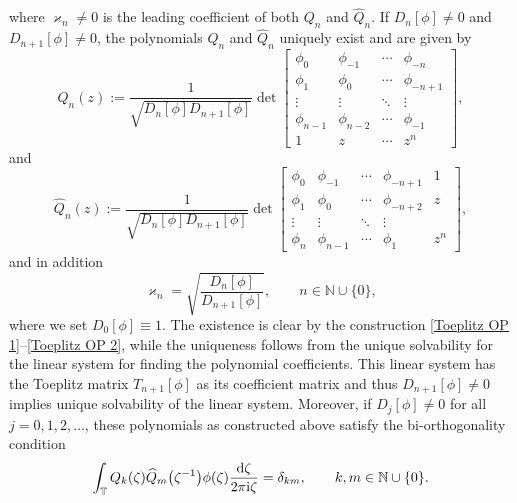 \documentclass[10pt,a4paper]{amsart}
\numberwithin{equation}{section}
\newcommand{\N}{{\mathbb N}}
\newcommand{\T}{{\mathbb T}}
\newcommand{\de}{\delta}
\newcommand{\ze}{\zeta}
\newcommand{\ii}{{\rm i}}
\newcommand{\dd}{{\rm d}}
\begin{document}
	where $\varkappa_n \neq 0$ is the leading coefficient of both $Q_n$ and $\widehat{Q}_n$. If $D_n[\phi] \neq 0$ and $D_{n+1}[\phi] \neq 0$, the polynomials $Q_n$ and $\widehat{Q}_n$ uniquely exist and are given by
	\begin{equation}\label{Toeplitz OP 1}
		Q_n(z):= \frac{1}{\sqrt{D_n[\phi] D_{n+1}[\phi]}} \det \begin{bmatrix}
			\phi_0 & \phi_{-1} & \cdots & \phi_{-n} \\
			\phi_1 & \phi_{0} & \cdots & \phi_{-n+1} \\
			\vdots & \vdots & \ddots & \vdots \\
			\phi_{n-1} & \phi_{n-2} & \cdots & \phi_{-1} \\
			1 & z & \cdots & z^n
		\end{bmatrix},
	\end{equation}
	and
	\begin{equation}\label{Toeplitz OP 2}
		\widehat{Q}_n(z) := \frac{1}{\sqrt{D_n[\phi] D_{n+1}[\phi]}} \det \begin{bmatrix}
			\phi_0 & \phi_{-1} & \cdots & \phi_{-n+1} & 1 \\
			\phi_1 & \phi_{0} & \cdots & \phi_{-n+2} & z \\
			\vdots & \vdots & \ddots & \vdots \\
			\phi_{n} & \phi_{n-1} & \cdots & \phi_{1} & z^n
		\end{bmatrix},
	\end{equation}
	and in addition
	\begin{equation}\label{varkappa}
		\varkappa_n = \sqrt{\frac{D_{n}[\phi]}{D_{n+1}[\phi]}}, \qquad n \in \N \cup \{0\},
	\end{equation}
	where we set $D_0[\phi] \equiv 1$. The existence is clear by the construction \eqref{Toeplitz OP 1}--\eqref{Toeplitz OP 2}, while the uniqueness follows from the unique solvability for the linear system for finding the polynomial coefficients. This linear system has the Toeplitz matrix $T_{n+1}[\phi]$ as its coefficient matrix and thus $D_{n+1}[\phi]\neq 0$ implies unique solvability of the linear system. Moreover, if $D_j[\phi] \neq 0$ for all~${j=0,1,2, \ldots}$, these polynomials as constructed above satisfy the bi-orthogonality condition
	\begin{equation}\label{biorthogonality}
		\int_{\T} Q_k(\ze)\widehat{Q}_m\big(\ze^{-1}\big)\phi(\ze)\frac{\dd \ze}{2\pi \ii \ze}= \de_{km}, \qquad k,m \in \N \cup \{0\}.
	\end{equation}
	
\end{document}
